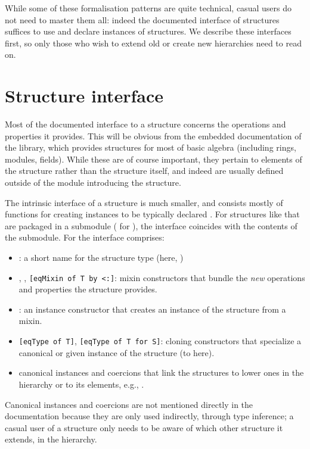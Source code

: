 While some of these formalisation patterns are quite technical, casual
users do not need to master them all: indeed the documented interface
of structures suffices to use and declare instances of structures. We
describe these interfaces first, so only those who wish to extend old
or create new hierarchies need to read on.

\section{Structure interface}\label{str:itf}

Most of the documented interface to a structure concerns the operations and
properties it provides. This will be obvious from the embedded
documentation of the  library, which provides structures for
most of basic algebra (including rings, modules, fields). While these
are of course important, they pertain to elements of the structure
rather than the structure itself, and indeed are usually defined
outside of the module introducing the structure.

The intrinsic interface of a structure is much smaller, and consists mostly
of functions for creating instances to be typically
declared . For structures like 
that are packaged in a submodule ( for ), the
interface coincides with the contents of the  submodule.
For  the interface comprises:
\begin{itemize}
\item {}: a short name for the structure type (here,
  )
\item {}, , \lstinline/[eqMixin of T by <:]/:
  mixin constructors that bundle the \emph{new} operations and
  properties the structure provides.
\item {}: an instance constructor that creates an instance of
  the structure from a mixin.
\item \lstinline/[eqType of T]/, \lstinline/[eqType of T for S]/:
  cloning constructors that specialize a canonical or given instance
  of the structure (to  here).
\item canonical instances and coercions that link the structures to lower ones
  in the hierarchy or to its elements, e.g., .
\end{itemize}
\index[coq]{\C{[eqMixin of .. by <:]}}
\index[coq]{\C{[eqType of ..]}}
Canonical instances and coercions are not mentioned directly in the
documentation because they are only used indirectly, through type
inference; a casual user of a structure only needs to be aware of which other
structure it extends, in the hierarchy.

